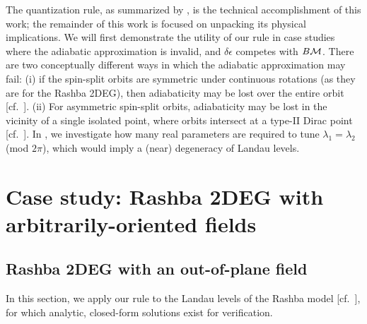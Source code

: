 \documentclass[aps, showpacs, twocolumn, notitlepage, superscriptaddress]{revtex4-1}
\begin{document}
The quantization rule, as summarized by , is the technical accomplishment of this work; the remainder of this work is focused on unpacking its physical implications. We will first demonstrate the utility of our rule in case studies where the adiabatic approximation is invalid, and $\delta \epsilon$ competes with $B{\cal M}$. There are two conceptually different ways in which the adiabatic approximation may fail: (i) if the spin-split orbits are  symmetric under continuous rotations (as they are for the Rashba 2DEG), then adiabaticity may be lost over the entire orbit [cf.\ ]. (ii) For asymmetric spin-split orbits, adiabaticity may be lost in the vicinity of a single isolated point, where orbits intersect at a type-II Dirac point [cf.\ ]. 
In , we investigate how many real parameters are required to tune $\lambda_1{=}\lambda_2$ (mod $2\pi$), which would imply a (near) degeneracy of Landau levels.  

\section{Case study: Rashba 2DEG with arbitrarily-oriented fields}

\subsection{Rashba 2DEG with an out-of-plane field}\label{sec:Rashba}

In this section, we apply our rule to the Landau levels of the Rashba model [cf.\ ], for which analytic, closed-form solutions exist for verification\cite{bychkov_oscillatory_1984}. 
\end{document}
